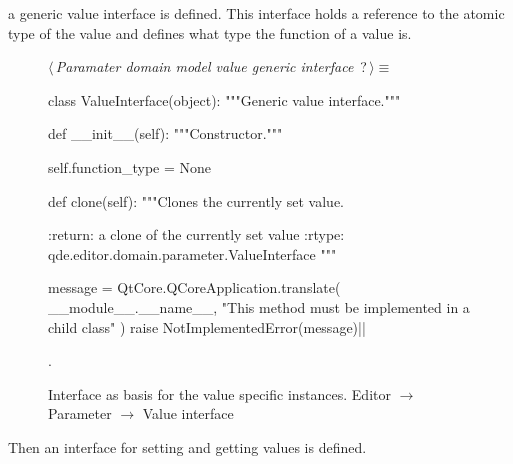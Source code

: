 \documentclass[%
    a4paper,    %
    justified,  %
    nobib,      %
    openany     %
]{tufte-book}
\begin{document}
 a generic value interface is
defined. This interface holds a reference to the atomic type of the value and
defines what type the function of a value is.

\begin{figure}
\begin{flushleft} \small
\begin{minipage}{\linewidth}\label{scrap130}\raggedright\small
{} $\langle\,${\itshape Paramater domain model value generic interface}\nobreak\ {\footnotesize {?}}$\,\rangle\equiv$
\vspace{-1ex}
\begin{pythoncode}
class ValueInterface(object):
    """Generic value interface."""

    def __init__(self):
        """Constructor."""

        self.function_type = None

    def clone(self):
        """Clones the currently set value.

        :return: a clone of the currently set value
        :rtype:  qde.editor.domain.parameter.ValueInterface
        """

        message = QtCore.QCoreApplication.translate(
            __module__.__name__,
            "This method must be implemented in a child class"
        )
        raise NotImplementedError(message)|\NWsep|
\end{pythoncode}
\vspace{1.5ex}
\footnotesize
\begin{list}{}{\setlength{\itemsep}{-\parsep}\setlength{\itemindent}{-\leftmargin}}
\item {\NWtxtMacroNoRef}.

\item{}
\end{list}
\end{minipage}\vspace{4ex}
\end{flushleft}
\caption{Interface as basis for the value specific instances.
  \newline{}\newline{}Editor $\rightarrow$ Parameter $\rightarrow$
  Value interface}
\label{editor:lst:parameter:value-interface}
\end{figure}

Then an interface for setting and getting values is defined.
\end{document}
